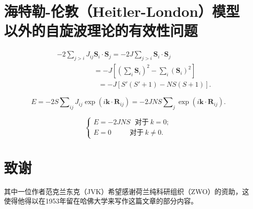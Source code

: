 \documentclass{article}
\begin{document}

\section{海特勒-伦敦（Heitler-London）模型以外的自旋波理论的有效性问题} \label{sec:11}


\begin{eqnarray} \label{eq:128}
&&-2\sum\nolimits_{j>i}J_{ij}\mathbf{S}_i\cdot\mathbf{S}_j=-2J\sum\nolimits_{j>i}\mathbf{S}_i\cdot\mathbf{S}_j\nonumber\\
&&~~~~~~~~~~~~~~~~~~~~~~~~=-J[(\sum\nolimits_i\mathbf{S}_i)^2-\sum\nolimits_i(\mathbf{S}_i)^2]\nonumber\\
&&~~~~~~~~~~~~~~~~~~~~~~~~~~~=-J[S'(S'+1)-NS(S+1)].
\end{eqnarray}

\begin{equation*} 
E=-2S\sum\nolimits_\mathit{ij}J_\mathit{ij}\exp(i\mathbf{k}\cdot\mathbf{R}_\mathit{ij})=-2JNS\sum\nolimits_j\exp(i\mathbf{k}\cdot\mathbf{R}_\mathit{ij}).
\end{equation*}

\begin{equation} \label{eq:129}
\left\{
\begin{array}{l}
E=-2JNS~~~\text{对于}~k=0;\\
E=0~~~~~~~~~~~~\text{对于}~k\neq 0.
\end{array}
\right.
\end{equation}

\section*{致谢}
其中一位作者范克兰东克（JVK）希望感谢荷兰纯科研组织（ZWO）的资助，这使得他得以在1953年留在哈佛大学来写作这篇文章的部分内容。
\end{document}
